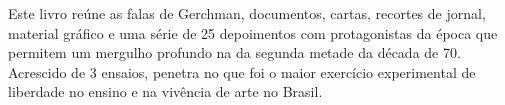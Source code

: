 \medskip

\noindent{}Este livro reúne as falas de Gerchman, documentos, cartas,
recortes de jornal, material gráfico e uma série de 25 depoimentos com
protagonistas da época que permitem
um mergulho profundo na  da segunda metade da década de 70. Acrescido de 3 ensaios, {} penetra no que foi o maior exercício experimental de liberdade no ensino e na vivência de arte no Brasil.

\hspace{.5cm}
\vfill

\hspace*{-.4cm}\begin{minipage}[c]{1\linewidth}
\small{
{}}
\end{minipage}


\pagebreak
